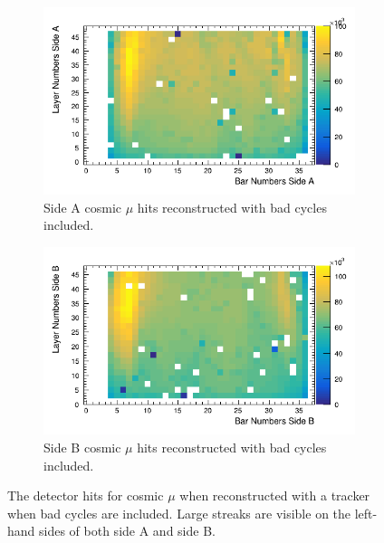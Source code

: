 \begin{figure}[htbp]
\centering
\begin{subfigure}{.5\textwidth}
  \centering
  \includegraphics[width=\linewidth]{Chapter5/Figs/Raster/sideAHitsWithBadCycles.png}
  \captionsetup{width=.9\linewidth}
  \caption{Side A cosmic $\mu$ hits reconstructed with bad cycles included.} 
  \label{subFig:sideAHitsWithBadCycles}
\end{subfigure}%
\begin{subfigure}{.5\textwidth}
  \centering
\includegraphics[width=\linewidth]{Chapter5/Figs/Raster/sideBHitsWithBadCycles.png}
  \captionsetup{width=.9\linewidth}
  \caption{Side B cosmic $\mu$ hits reconstructed with bad cycles included.}
  \label{subFig:sideBHitsWithBadCycles}
\end{subfigure}
\caption{The detector hits for cosmic $\mu$ when reconstructed with a tracker when bad cycles are included. Large streaks are visible on the left-hand sides of both side A and side B.}
\label{fig:sideABHitsWithBadCycles}
\end{figure}

